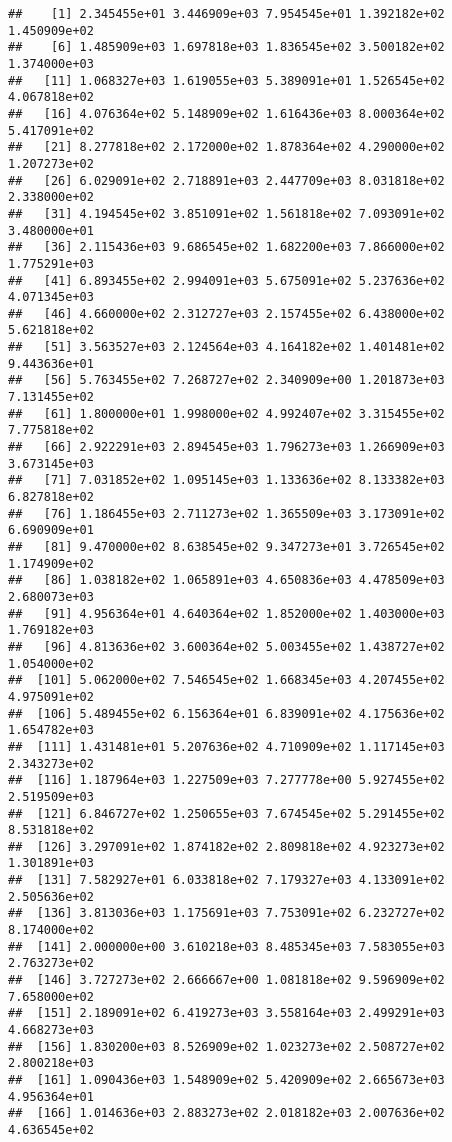 \documentclass[]{article}
\begin{document}
\begin{verbatim}
##    [1] 2.345455e+01 3.446909e+03 7.954545e+01 1.392182e+02 1.450909e+02
##    [6] 1.485909e+03 1.697818e+03 1.836545e+02 3.500182e+02 1.374000e+03
##   [11] 1.068327e+03 1.619055e+03 5.389091e+01 1.526545e+02 4.067818e+02
##   [16] 4.076364e+02 5.148909e+02 1.616436e+03 8.000364e+02 5.417091e+02
##   [21] 8.277818e+02 2.172000e+02 1.878364e+02 4.290000e+02 1.207273e+02
##   [26] 6.029091e+02 2.718891e+03 2.447709e+03 8.031818e+02 2.338000e+02
##   [31] 4.194545e+02 3.851091e+02 1.561818e+02 7.093091e+02 3.480000e+01
##   [36] 2.115436e+03 9.686545e+02 1.682200e+03 7.866000e+02 1.775291e+03
##   [41] 6.893455e+02 2.994091e+03 5.675091e+02 5.237636e+02 4.071345e+03
##   [46] 4.660000e+02 2.312727e+03 2.157455e+02 6.438000e+02 5.621818e+02
##   [51] 3.563527e+03 2.124564e+03 4.164182e+02 1.401481e+02 9.443636e+01
##   [56] 5.763455e+02 7.268727e+02 2.340909e+00 1.201873e+03 7.131455e+02
##   [61] 1.800000e+01 1.998000e+02 4.992407e+02 3.315455e+02 7.775818e+02
##   [66] 2.922291e+03 2.894545e+03 1.796273e+03 1.266909e+03 3.673145e+03
##   [71] 7.031852e+02 1.095145e+03 1.133636e+02 8.133382e+03 6.827818e+02
##   [76] 1.186455e+03 2.711273e+02 1.365509e+03 3.173091e+02 6.690909e+01
##   [81] 9.470000e+02 8.638545e+02 9.347273e+01 3.726545e+02 1.174909e+02
##   [86] 1.038182e+02 1.065891e+03 4.650836e+03 4.478509e+03 2.680073e+03
##   [91] 4.956364e+01 4.640364e+02 1.852000e+02 1.403000e+03 1.769182e+03
##   [96] 4.813636e+02 3.600364e+02 5.003455e+02 1.438727e+02 1.054000e+02
##  [101] 5.062000e+02 7.546545e+02 1.668345e+03 4.207455e+02 4.975091e+02
##  [106] 5.489455e+02 6.156364e+01 6.839091e+02 4.175636e+02 1.654782e+03
##  [111] 1.431481e+01 5.207636e+02 4.710909e+02 1.117145e+03 2.343273e+02
##  [116] 1.187964e+03 1.227509e+03 7.277778e+00 5.927455e+02 2.519509e+03
##  [121] 6.846727e+02 1.250655e+03 7.674545e+02 5.291455e+02 8.531818e+02
##  [126] 3.297091e+02 1.874182e+02 2.809818e+02 4.923273e+02 1.301891e+03
##  [131] 7.582927e+01 6.033818e+02 7.179327e+03 4.133091e+02 2.505636e+02
##  [136] 3.813036e+03 1.175691e+03 7.753091e+02 6.232727e+02 8.174000e+02
##  [141] 2.000000e+00 3.610218e+03 8.485345e+03 7.583055e+03 2.763273e+02
##  [146] 3.727273e+02 2.666667e+00 1.081818e+02 9.596909e+02 7.658000e+02
##  [151] 2.189091e+02 6.419273e+03 3.558164e+03 2.499291e+03 4.668273e+03
##  [156] 1.830200e+03 8.526909e+02 1.023273e+02 2.508727e+02 2.800218e+03
##  [161] 1.090436e+03 1.548909e+02 5.420909e+02 2.665673e+03 4.956364e+01
##  [166] 1.014636e+03 2.883273e+02 2.018182e+03 2.007636e+02 4.636545e+02

\end{verbatim}
\end{document}
